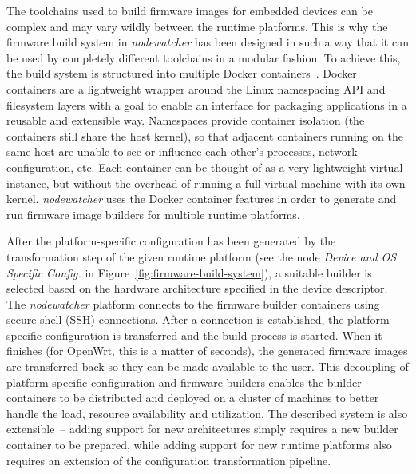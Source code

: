 \documentclass[5p,sort&compress]{elsarticle}
\newcommand{\nodewatcher}{\textit{nodewatcher}}
\begin{document}
The toolchains used to build firmware images for embedded devices can be complex and may vary wildly between the runtime platforms.
This is why the firmware build system in \nodewatcher{} has been designed in such a way that it can be used by completely different toolchains in a modular fashion.
To achieve this, the build system is structured into multiple Docker containers~\cite{Docker_2013}.
Docker containers are a lightweight wrapper around the Linux namespacing API and filesystem layers with a goal to enable an interface for packaging applications in a reusable and extensible way.
Namespaces provide container isolation (the containers still share the host kernel), so that adjacent containers running on the same host are unable to see or influence each other's processes, network configuration, etc.
Each container can be thought of as a very lightweight virtual instance, but without the overhead of running a full virtual machine with its own kernel.
\nodewatcher{} uses the Docker container features in order to generate and run firmware image builders for multiple runtime platforms.

After the platform-specific configuration has been generated by the transformation step of the given runtime platform (see the node \textit{Device and OS Specific Config.} in Figure~\ref{fig:firmware-build-system}), a suitable builder is selected based on the hardware architecture specified in the device descriptor.
The \nodewatcher{} platform connects to the firmware builder containers using secure shell (SSH) connections.
After a connection is established, the platform-specific configuration is transferred and the build process is started.
When it finishes (for OpenWrt, this is a matter of seconds), the generated firmware images are transferred back so they can be made available to the user.
This decoupling of platform-specific configuration and firmware builders enables the builder containers to be distributed and deployed on a cluster of machines to better handle the load, resource availability and utilization.
The described system is also extensible~-- adding support for new architectures simply requires a new builder container to be prepared, while adding support for new runtime platforms also requires an extension of the configuration transformation pipeline.
\end{document}
